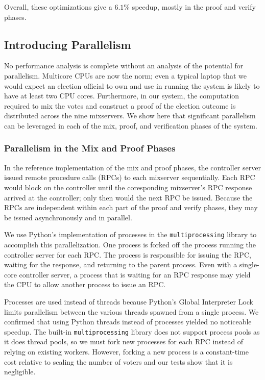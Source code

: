 Overall, these optimizations give a $6.1\%$ speedup, mostly in the proof and verify phases.

\subsection{Introducing Parallelism} \label{perf:optimizations:parallel}

No performance analysis is complete without an analysis of the potential for parallelism. Multicore CPUs are now the norm; even a typical laptop that we would expect an election official to own and use in running the system is likely to have at least two CPU cores. Furthermore, in our system, the computation required to mix the votes and construct a proof of the election outcome is distributed across the nine mixservers. We show here that significant parallelism can be leveraged in each of the mix, proof, and verification phases of the system.

\subsubsection{Parallelism in the Mix and Proof Phases}

In the reference implementation of the mix and proof phases, the controller server issued remote procedure calls (RPCs) to each mixserver sequentially. Each RPC would block on the controller until the coresponding mixserver's RPC response arrived at the controller; only then would the next RPC be issued. Because the RPCs are independent within each part of the proof and verify phases, they may be issued asynchronously and in parallel.

We use Python's implementation of processes in the \texttt{multiprocessing} library to accomplish this parallelization. One process is forked off the process running the controller server for each RPC. The process is responsible for issuing the RPC, waiting for the response, and returning to the parent process. Even with a single-core controller server, a process that is waiting for an RPC response may yield the CPU to allow another process to issue an RPC.

Processes are used instead of threads because Python's Global Interpreter Lock limits parallelism between the various threads spawned from a single process. We confirmed that using Python threads instead of processes yielded no noticeable speedup. The built-in \texttt{multiprocessing} library does not support process pools as it does thread pools, so we must fork new processes for each RPC instead of relying on existing workers. However, forking a new process is a constant-time cost relative to scaling the number of voters and our tests show that it is negligible.


